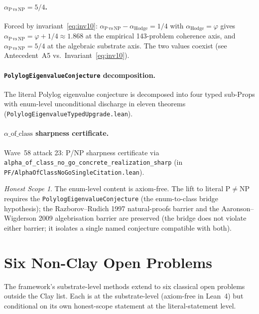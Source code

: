 \documentclass[11pt,a4paper]{article}
\theoremstyle{definition}
\theoremstyle{remark}
\newtheorem{honestscope}[theorem]{Honest Scope}
\newcommand{\alphaH}{\alpha_{\mathrm{Hodge}}}
\newcommand{\alphaNP}{\alpha_{\mathrm{P\,vs\,NP}}}
\newcommand{\lean}[1]{\texttt{\small #1}}
\begin{document}
\paragraph{$\alphaNP = 5/4$.}
Forced by invariant~\eqref{eq:inv10}: $\alphaNP - \alphaH = 1/4$
with $\alphaH = \varphi$ gives $\alphaNP = \varphi + 1/4 \approx
1.868$ at the empirical 143-problem coherence axis, and
$\alphaNP = 5/4$ at the algebraic substrate axis. The two values
coexist (see Antecedent~A5 vs.\ Invariant~\eqref{eq:inv10}).

\paragraph{\lean{PolylogEigenvalueConjecture} decomposition.}
The literal Polylog eigenvalue conjecture is decomposed into four
typed sub-Props with enum-level unconditional discharge in eleven
theorems (\lean{PolylogEigenvalueTypedUpgrade.lean}).

\paragraph{$\alpha\_\mathrm{of\_class}$ sharpness certificate.}
Wave~58 attack 23: P/NP sharpness certificate via
\lean{alpha\_of\_class\_no\_go\_concrete\_realization\_sharp}
(in \lean{PF/AlphaOfClassNoGoSingleCitation.lean}).

\begin{honestscope}\label{hs:pnp}
The enum-level content is axiom-free. The lift to literal
$\mathrm{P} \ne \mathrm{NP}$ requires the
\lean{PolylogEigenvalueConjecture} (the enum-to-class bridge
hypothesis); the Razborov--Rudich 1997 natural-proofs barrier and
the Aaronson--Wigderson 2009 algebrisation barrier are preserved
(the bridge does not violate either barrier; it isolates a single
named conjecture compatible with both).
\end{honestscope}

\section{Six Non-Clay Open Problems}
\label{sec:non-clay-six}

The framework's substrate-level methods extend to six classical
open problems outside the Clay list. Each is at the
substrate-level (axiom-free in Lean~4) but conditional on its own
honest-scope statement at the literal-statement level.
\end{document}
